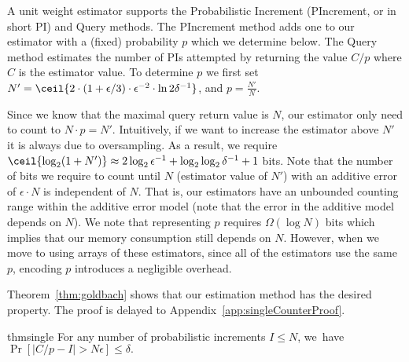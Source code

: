 A unit weight estimator supports the {\sc Probabilistic Increment (PIncrement}, or in short PI) and {\sc Query} methods. 
The {\sc PIncrement} method 
adds one to our estimator with a (fixed) probability $p$ which we determine below.  The {\sc Query} method
estimates the number of PIs attempted by returning the value $C/p$ where $C$ is the estimator value. 
%
To determine $p$ we first set $N'=\ceil{2\cdot(1+\epsilon/3)\cdot\epsilon^{-2}\cdot{\ln2\delta^{-1}}}$, and $p=\frac{N'}{N}$.  

Since we know that the maximal query return value is $N$, our estimator only need to count to $N\cdot p =N'$. Intuitively, if we want to increase the estimator above $N'$ it is always due to oversampling.  As a result, we require $\ceil{\log_2(1+N')}\approx 2\log_2\epsilon^{-1} + \log_2\log_2\delta^{-1}+1$ bits. 
Note that the number of bits we require to count until $N$ (estimator value of $N'$) with an additive error of $\epsilon \cdot N$ is independent of $N$. That is, our estimators have an unbounded counting range within the additive error model (note that the  error in the additive model depends on $N$). 
We note that representing $p$ requires $\Omega(\log N)$ bits which implies that our memory consumption still depends on $N$. However, when we move to using arrays of these estimators, since all of the estimators use the same $p$, encoding $p$ introduces a negligible overhead. 

Theorem~\ref{thm:goldbach} shows that our estimation method has the desired property. 
The proof is delayed to Appendix~\ref{app:singleCounterProof}.
\begin{restatable*}{thm}{single}
\label{thm:goldbach}
For any number of probabilistic increments $I\le N$, \mbox{we have $\Pr[|C/p-I|> N\epsilon]\le\delta.$}
\end{restatable*}

